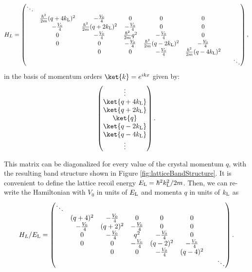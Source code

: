 \begin{equation}
H_L =
 \begin{pmatrix} \ddots &  & & & & & & \\ 
 & \frac{\hbar^2}{2m}(q + 4 k_{\rm L} )^2 & -\frac{V_0}{4} & 0 & 0 & 0 &  \\
 &- \frac{V_0}{4} &\frac{\hbar^2}{2m}(q + 2 k_{\rm L} )^2 & -\frac{V_0}{4} & 0 & 0 &  \\
& 0 & -\frac{V_0}{4} & \frac{\hbar^2}{2m}q^2 & -\frac{V_0}{4} & 0 &  \\
 & 0 & 0 & -\frac{V_0}{4} & \frac{\hbar^2}{2m}(q - 2 k_{\rm L})^2 & -\frac{V_0}{4} &  \\
 &  & 0 & 0 & -\frac{V_0}{4} & \frac{\hbar^2}{2m}(q - 4 k_{\rm L})^2 &  \\
& & & & & & &  \ddots \end{pmatrix} \\,
\label{eqn:LatHam}
\end{equation}
in the basis of momentum orders $\ket{k}=e^{i k x}$ given by:
\begin{equation}
 \begin{pmatrix} \vdots \\
\ket{q+4 k_{\rm L}}\\
\ket{q+2 k_{\rm L}}\\
\ket{q}\\
\ket{q -2 k_{\rm L}}\\
\ket{q - 4 k_{\rm L}}\\
\vdots
\end{pmatrix} \\.
\end{equation}

This matrix can be diagonalized for every value of the crystal momentum $q$, with the resulting band structure shown in Figure \ref{fig:latticeBandStructure}. It is convenient to define the lattice recoil energy $E_{\rm L} = \hbar^2 k_{\rm L}^2/2m$. Then, we can re-write the Hamiltonian with $V_0$ in units of $E_{\rm L}$ and momenta $q$ in units of $k_{\rm L}$ as 
\begin{equation}
H_L/E_{\rm L} =
 \begin{pmatrix} \ddots &  & & & & & & \\ 
 & (q + 4)^2 & -\frac{V_0}{4} & 0 & 0 & 0 &  \\
 & -\frac{V_0}{4} &(q + 2)^2 & -\frac{V_0}{4} & 0 & 0 &  \\
& 0 & -\frac{V_0}{4} & q^2 & -\frac{V_0}{4} & 0 &  \\
 & 0 & 0 & -\frac{V_0}{4} & (q - 2)^2 & -\frac{V_0}{4} &  \\
 &  & 0 & 0 & -\frac{V_0}{4} & (q  - 4)^2 &  \\
& & & & & & &  \ddots \end{pmatrix} \\.
\end{equation}

